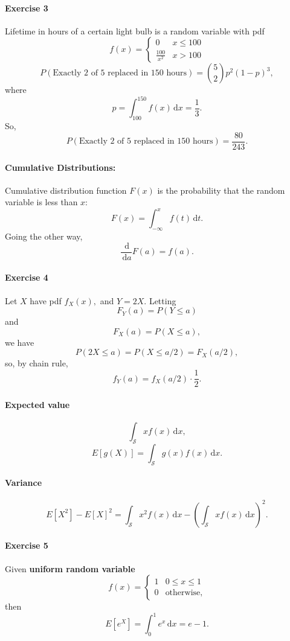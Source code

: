 \documentclass[12pt]{article}
\newcommand{\diffn}[1]{\,\mathrm{d}{#1}}
\newcommand{\fdiffn}[2]{\frac{\diffn{#1}}{\diffn{#2}}}
\begin{document}
\paragraph{Exercise 3}
Lifetime in hours of a certain light bulb is a random variable with pdf
\[
f(x) = \begin{cases}
    0 & x \le 100 \\
    \frac{100}{x^2} & x > 100
\end{cases}
\]
\[P(\text{Exactly 2 of 5 replaced in 150 hours})  = \binom{5}{2}p^2(1-p)^3,\]
where
\[p=\int_{100}^{150}f(x)\diffn{x}=\frac{1}{3}.\]
So,
\[P(\text{Exactly 2 of 5 replaced in 150 hours})=\frac{80}{243}.\]

\paragraph{Cumulative Distributions:}
Cumulative distribution function $F(x)$ is the probability that the random variable is less than $x$:
\[F(x) = \int_{-\infty}^x f(t)\,\mathrm{d}t.\]
Going the other way,
\[\fdiffn{}{a} F(a)=f(a).\]
\paragraph{Exercise 4}
Let $X$ have pdf $f_X(x),$
and $Y=2X.$
Letting
\[F_Y(a)=P(Y\le a)\]
and
\[F_X(a)=P(X\le a),\]
we have
\[P(2X\le a)=P(X\le a/2)=F_X(a/2),\]
so, by chain rule,
\[f_Y(a)=f_X(a/2)\cdot\frac{1}{2}.\]


\paragraph{Expected value}
\[\int_{\mathcal{S}}xf(x)\diffn{x},\]
\[E[g(X)]=\int_{\mathcal{S}}g(x)f(x)\diffn{x}.\]
\paragraph{Variance}
\[E[X^2]-E[X]^2=\int_{\mathcal{S}} x^2f(x)\diffn{x}-\left(\int_{\mathcal{S}} xf(x)\diffn{x}\right)^2.\]
\paragraph{Exercise 5}
Given \textbf{uniform random variable}
\[f(x)=\begin{cases}
    1&0\le x\le 1\\
    0&\text{otherwise},
\end{cases}\]
then
\[E\left[e^X\right]=\int_0^1e^x\diffn{x}=e-1.\]
\end{document}
